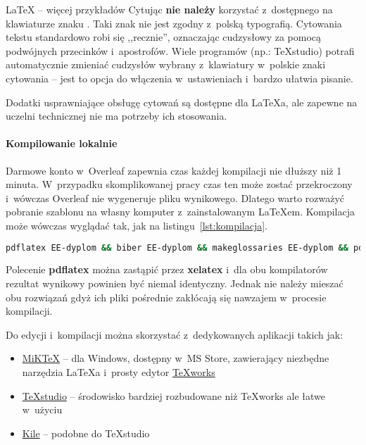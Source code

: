 \begin{easyappendix}{\LaTeX{} -- więcej przykładów}
Cytując \textbf{nie należy} korzystać z~dostępnego na klawiaturze znaku . Taki znak nie jest zgodny z~polską typografią. Cytowania tekstu standardowo robi się ,,recznie'', oznaczając cudzysłowy za pomocą podwójnych przecinków i~apostrofów. Wiele programów (np.: TeXstudio) potrafi automatycznie zmieniać cudzysłów wybrany z~klawiatury w~polskie znaki cytowania -- jest to opcja do włączenia w~ustawieniach i~bardzo ułatwia pisanie.

Dodatki usprawniające obsługę cytowań są dostępne dla \LaTeX{a}, ale zapewne na uczelni technicznej nie ma potrzeby ich stosowania.

\paragraph{Kompilowanie lokalnie}
Darmowe konto w~Overleaf zapewnia czas każdej kompilacji nie dłuższy niż 1 minuta. W~przypadku skomplikowanej pracy czas ten może zostać przekroczony i~wówczas Overleaf nie wygeneruje pliku wynikowego. Dlatego warto rozważyć pobranie szablonu na własny komputer z~zainstalowanym \LaTeX{em}. Kompilacja może wówczas wyglądać tak, jak na listingu~\ref{lst:kompilacja}.

\begin{lstlisting}[language=bash,
	caption={Kompilacja pracy dyplomowej lokalnie},
	label={lst:kompilacja}]
	pdflatex EE-dyplom && biber EE-dyplom && makeglossaries EE-dyplom && pdflatex EE-dyplom && pdflatex EE-dyplom
\end{lstlisting}

Polecenie \textbf{pdflatex} można zastąpić przez \textbf{xelatex} i~dla obu kompilatorów rezultat wynikowy powinien być niemal identyczny. Jednak nie należy mieszać obu rozwiązań gdyż ich pliki pośrednie zakłócają się nawzajem w~procesie kompilacji.

Do edycji i~kompilacji można skorzystać z~dedykowanych aplikacji takich jak:
\begin{itemize}
	\item \href{https://miktex.org/}{MiKTeX} -- dla Windows, dostępny w~MS Store, zawierający niezbędne narzędzia \LaTeX{a} i~prosty edytor \href{https://www.tug.org/texworks/}{TeXworks}
	\item \href{https://www.texstudio.org/}{TeXstudio} -- środowisko bardziej rozbudowane niż TeXworks ale łatwe w~użyciu
	\item \href{https://kile.sourceforge.io/}{Kile} -- podobne do TeXstudio
\end{itemize}


\end{easyappendix}
